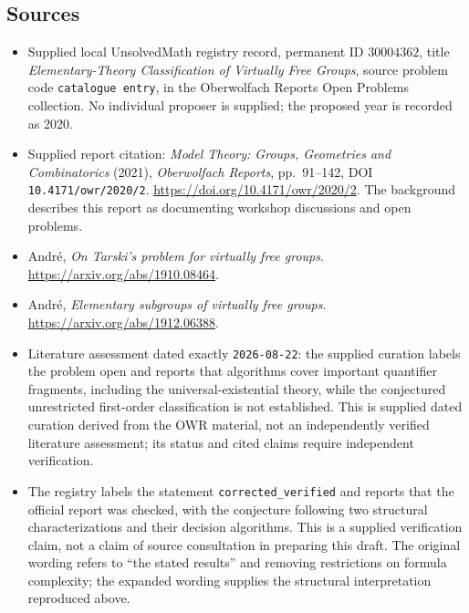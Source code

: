 \documentclass[11pt]{article}
\begin{document}
\subsection{Sources}
\begin{itemize}
\item Supplied local UnsolvedMath registry record, permanent ID \(30004362\), title \emph{Elementary-Theory Classification of Virtually Free Groups}, source problem code \texttt{catalogue entry}, in the Oberwolfach Reports Open Problems collection. No individual proposer is supplied; the proposed year is recorded as 2020.
\item Supplied report citation: \emph{Model Theory: Groups, Geometries and Combinatorics} (2021), \emph{Oberwolfach Reports}, pp.~91--142, DOI \texttt{10.4171/owr/2020/2}. \url{https://doi.org/10.4171/owr/2020/2}. The background describes this report as documenting workshop discussions and open problems.
\item Andr\'e, \emph{On Tarski's problem for virtually free groups}. \url{https://arxiv.org/abs/1910.08464}.
\item Andr\'e, \emph{Elementary subgroups of virtually free groups}. \url{https://arxiv.org/abs/1912.06388}.
\item Literature assessment dated exactly \texttt{2026-08-22}: the supplied curation labels the problem open and reports that algorithms cover important quantifier fragments, including the universal-existential theory, while the conjectured unrestricted first-order classification is not established. This is supplied dated curation derived from the OWR material, not an independently verified literature assessment; its status and cited claims require independent verification.
\item The registry labels the statement \texttt{corrected\_verified} and reports that the official report was checked, with the conjecture following two structural characterizations and their decision algorithms. This is a supplied verification claim, not a claim of source consultation in preparing this draft. The original wording refers to ``the stated results'' and removing restrictions on formula complexity; the expanded wording supplies the structural interpretation reproduced above.
\end{itemize}
\end{document}
